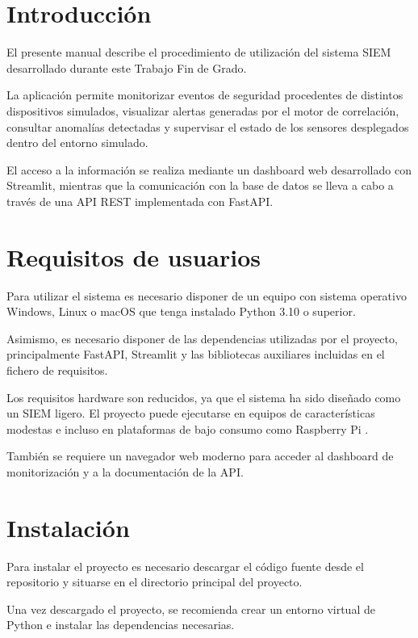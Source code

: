 
\section{Introducción}

El presente manual describe el procedimiento de utilización del sistema SIEM desarrollado durante este Trabajo Fin de Grado.

La aplicación permite monitorizar eventos de seguridad procedentes de distintos dispositivos simulados, visualizar alertas generadas por el motor de correlación, consultar anomalías detectadas y supervisar el estado de los sensores desplegados dentro del entorno simulado.

El acceso a la información se realiza mediante un dashboard web desarrollado con Streamlit, mientras que la comunicación con la base de datos se lleva a cabo a través de una API REST implementada con FastAPI.

\section{Requisitos de usuarios}

Para utilizar el sistema es necesario disponer de un equipo con sistema operativo Windows, Linux o macOS que tenga instalado Python 3.10 o superior.

Asimismo, es necesario disponer de las dependencias utilizadas por el proyecto, principalmente FastAPI, Streamlit y las bibliotecas auxiliares incluidas en el fichero de requisitos.

Los requisitos hardware son reducidos, ya que el sistema ha sido diseñado como un SIEM ligero. El proyecto puede ejecutarse en equipos de características modestas e incluso en plataformas de bajo consumo como Raspberry Pi \cite{raspberrypi}.

También se requiere un navegador web moderno para acceder al dashboard de monitorización y a la documentación de la API.

\section{Instalación}

Para instalar el proyecto es necesario descargar el código fuente desde el repositorio y situarse en el directorio principal del proyecto.

Una vez descargado el proyecto, se recomienda crear un entorno virtual de Python e instalar las dependencias necesarias.

